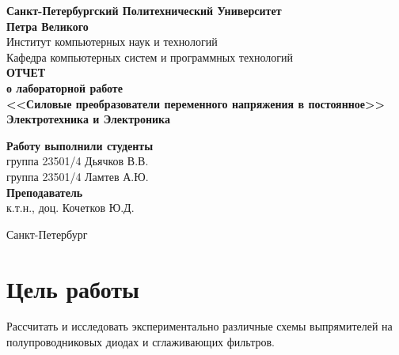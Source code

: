 \documentclass[a4paper,14pt]{extarticle}
\newcommand{\sign}[1][5cm]{\makebox[#1]{\hrulefill}} %
\begin{document}
\begin{titlepage}
\begin{center}
	\textbf{Санкт-Петербургский Политехнический Университет \\Петра Великого}\\[0.3cm]
	\small Институт компьютерных наук и технологий \\[0.3cm]
	\small Кафедра компьютерных систем и программных технологий\\[4cm]
	
	\textbf{ОТЧЕТ}\\ \textbf{о лабораторной работе}\\[0.5cm]
	\textbf{<<Силовые преобразователи переменного напряжения в постоянное>>}\\[0.1cm]
	\textbf{Электротехника и Электроника}\\[10.5cm]
\end{center}

\begin{flushright}
	\begin{minipage}{0.60\textwidth}
		\begin{flushleft}
			\small \textbf{Работу выполнили студенты}\\[3mm]
			\small группа 23501/4 \hspace*{17mm} Дьячков В.В.\\[3mm]
			\small группа 23501/4 \hspace*{17mm} Ламтев А.Ю.\\[5mm]
			
			\small \textbf{Преподаватель}\\[5mm]
		 	\small \sign[3.5cm] \hspace*{8mm} к.т.н., доц. Кочетков Ю.Д.\\[0.5cm]
		\end{flushleft}
	\end{minipage}
\end{flushright}

\vfill

\begin{center}
	\small Санкт-Петербург\\
	\small \the\year
\end{center}
\end{titlepage}

\section{Цель работы}

Рассчитать и исследовать экспериментально различные схемы выпрямителей на полупроводниковых диодах и сглаживающих фильтров.
\end{document}
